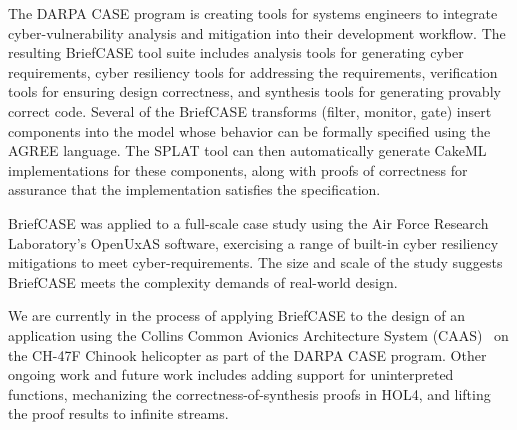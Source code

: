 The DARPA CASE program is creating tools for systems engineers to
integrate cyber-vulnerability analysis and mitigation into their
development workflow. The resulting BriefCASE tool suite includes
analysis tools for generating cyber requirements, cyber resiliency
tools for addressing the requirements, verification tools for ensuring
design correctness, and synthesis tools for generating provably
correct code. Several of the BriefCASE transforms (filter, monitor,
gate) insert components into the model whose behavior can be formally
specified using the AGREE language.  The SPLAT tool can then
automatically generate CakeML implementations for these components,
along with proofs of correctness for assurance that the implementation
satisfies the specification.

BriefCASE was applied to a full-scale case study using the Air Force
Research Laboratory's OpenUxAS software, exercising a range of
built-in cyber resiliency mitigations to meet cyber-requirements.  The
size and scale of the study suggests BriefCASE meets the complexity
demands of real-world design.

We are currently in the process of applying BriefCASE to the design of
an application using the Collins Common Avionics Architecture System
(CAAS)~\cite{caas} on the CH-47F Chinook helicopter as part of the
DARPA CASE program.  Other ongoing work and future work includes
adding support for uninterpreted functions, mechanizing the
correctness-of-synthesis proofs in HOL4, and lifting the proof results
to infinite streams.

